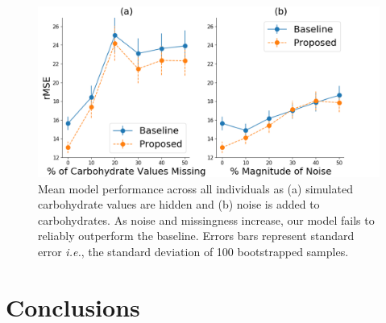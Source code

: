 \documentclass[letterpaper]{article}
\begin{document}
\begin{figure}[t]
\centering
\includegraphics[height=1.62 in]{carbmissplot.png}
\caption{Mean model performance across all individuals as (a) simulated carbohydrate values are hidden and (b) noise is added to carbohydrates. As noise and missingness increase, our model fails to reliably outperform the baseline. Errors bars represent standard error \textit{i.e.}, the standard deviation of 100 bootstrapped samples.  }\label{fig:carbmiss}
\end{figure}








\vspace{-0.89mm}
\vspace{-1.55mm}
\section{Conclusions}
\end{document}
